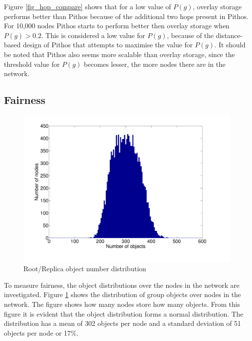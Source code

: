 \documentclass[10pt,a4paper,conference]{IEEEtran}
\begin{document}
Figure \ref{fig_hop_compare} shows that for a low value of $P(g)$, overlay storage performs better than Pithos because of the additional two hops
present in Pithos. For 10,000 nodes Pithos starts to perform better then overlay storage when $P(g) > 0.2$. This is considered a low value for
$P(g)$, because of the distance-based design of Pithos that attempts to maximise the value for $P(g)$. It should be noted that Pithos also seems more
scalable than overlay storage, since the threshold value for $P(g)$ becomes lesser, the more nodes there are in the network.

\subsection{Fairness}
\label{fairness_results}

\begin{figure}[htbp]
 \centering
 \includegraphics[clip=true, viewport=1.5cm 1.8cm 26.5cm 20cm, width=\columnwidth]{RootRepObjects}
 \caption{Root/Replica object number distribution}
 \label{fig_group_objects}
\end{figure}
%
To measure fairness, the object distributions over the nodes in the network are investigated. Figure \ref{fig_group_objects} shows the distribution
of group objects over nodes in the network. The figure shows how many nodes store how many objects. From this figure it is evident that the object
distribution forms a normal distribution. The distribution has a mean of 302 objects per node and a standard deviation of 51 objects per node or
17\%.
\end{document}
